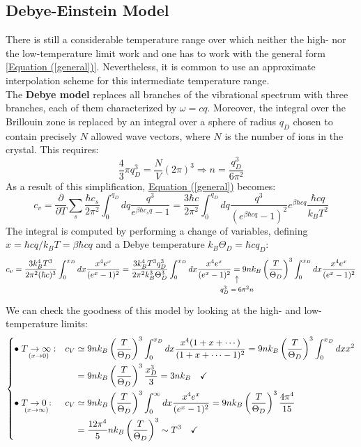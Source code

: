 \documentclass[10.75pt,a4paper,openright,bottom=2cm]{article}
\begin{document}
\subsection{Debye-Einstein Model}
There is still a considerable temperature range over which neither the high- nor the low-temperature limit work and one has to work with the general form [\hyperref[general]{Equation (\ref{general})}]. Nevertheless, it is common to use an approximate interpolation scheme for this intermediate temperature range.\\
The \textbf{Debye model} replaces all branches of the vibrational spectrum with three branches, each of them characterized by $\omega=cq$. Moreover, the integral over the  Brillouin zone is replaced by an integral over a sphere of radius $q_D$ chosen to contain precisely $N$ allowed wave vectors, where $N$ is the number of ions in the crystal. This requires:
\[
\frac{4}{3}\pi q_D^3=\frac{N}{V}(2\pi)^3\Rightarrow n=\frac{q_D^3}{6\pi^2}
\]
As a result of this simplification, \hyperref[general]{Equation (\ref{general})} becomes:
\[
c_v=\frac{\partial}{\partial T}\sum_s\frac{\hbar c_s}{2\pi^2}\int_0^{q_D}dq\frac{q^3}{e^{\beta\hbar c_sq}-1}=\frac{3\hbar c}{2\pi^2}\int_0^{q_D}dq\frac{q^3}{(e^{\beta\hbar cq}-1)^2}e^{\beta\hbar cq}\frac{\hbar cq}{k_BT^2}
\]
The integral is computed by performing a change of variables, defining $x=\hbar cq/k_BT=\beta\hbar cq$ and a Debye temperature $k_B\Theta_D=\hbar cq_D$:
\[
c_v=\frac{3k_B^4T^3}{2\pi^2(\hbar c)^3}\int_0^{x_D}dx\frac{x^4e^x}{(e^x-1)^2}=\frac{3k_B^4T^3q_D^3}{2\pi^2k_B^3\Theta_D^3}\int_0^{x_D}dx\frac{x^4e^x}{(e^x-1)^2}\underset{\mathclap{\tikz \node {$\uparrow$} node [below=1ex] {\footnotesize $q_D^3=6\pi^2n$};}}{=}9nk_B\left(\frac{T}{\Theta_D}\right)^3\int_0^{x_D}dx\frac{x^4e^x}{(e^x-1)^2}
\]
We can check the goodness of this model by looking at the high- and low-temperature limits:
\[
\left\{
\begin{aligned}
&\bullet\underset{(x\to0)}{T\to\infty:}&&c_V\simeq9nk_B\left(\frac{T}{\Theta_D}\right)^3\int_0^{x_D}dx\frac{x^4(1+x+\cdots)}{(1+x+\cdots-1)^2}=9nk_B\left(\frac{T}{\Theta_D}\right)^3\int_0^{x_D}dxx^2\\
& &&{\color{white}{c_V}}=9nk_B\left(\frac{T}{\Theta_D}\right)^3\frac{x_D^3}{3}=3nk_B \quad \checkmark\\
&\bullet\underset{(x\to\infty)}{T\to0:}&&c_V\simeq9nk_B\left(\frac{T}{\Theta_D}\right)^3\int_0^\infty dx\frac{x^4e^x}{(e^x-1)^2}=9nk_B\left(\frac{T}{\Theta_D}\right)^3\frac{4\pi^4}{15}\\
& &&{\color{white}{c_V}}=\frac{12\pi^4}{5}nk_B\left(\frac{T}{\Theta_D}\right)^3\sim T^3 \quad \checkmark
\end{aligned}
\right.
\]
\end{document}
